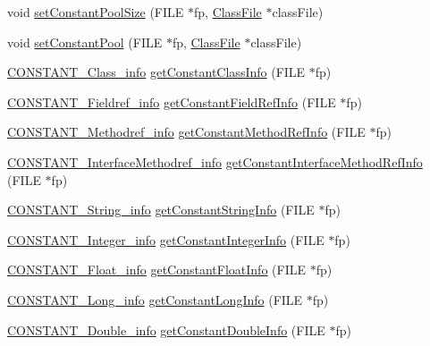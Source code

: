 \begin{DoxyCompactItemize}
void \hyperlink{classLeitorExibidor_a13b5c2cf5de57b6cea330a425f7e55be}{set\+Constant\+Pool\+Size} (F\+I\+LE $\ast$fp, \hyperlink{classClassFile}{Class\+File} $\ast$class\+File)
\item 
void \hyperlink{classLeitorExibidor_a34dc148775506753f609e643ac931cac}{set\+Constant\+Pool} (F\+I\+LE $\ast$fp, \hyperlink{classClassFile}{Class\+File} $\ast$class\+File)
\item 
\hyperlink{structCONSTANT__Class__info}{C\+O\+N\+S\+T\+A\+N\+T\+\_\+\+Class\+\_\+info} \hyperlink{classLeitorExibidor_a105cc85df3dce1817b67d49a6af55075}{get\+Constant\+Class\+Info} (F\+I\+LE $\ast$fp)
\item 
\hyperlink{structCONSTANT__Fieldref__info}{C\+O\+N\+S\+T\+A\+N\+T\+\_\+\+Fieldref\+\_\+info} \hyperlink{classLeitorExibidor_abef996cec1493870298ba1c13aba9a12}{get\+Constant\+Field\+Ref\+Info} (F\+I\+LE $\ast$fp)
\item 
\hyperlink{structCONSTANT__Methodref__info}{C\+O\+N\+S\+T\+A\+N\+T\+\_\+\+Methodref\+\_\+info} \hyperlink{classLeitorExibidor_adfb763ec31e25964a5566c3d453ea297}{get\+Constant\+Method\+Ref\+Info} (F\+I\+LE $\ast$fp)
\item 
\hyperlink{structCONSTANT__InterfaceMethodref__info}{C\+O\+N\+S\+T\+A\+N\+T\+\_\+\+Interface\+Methodref\+\_\+info} \hyperlink{classLeitorExibidor_a01b35468a048d479576f9c99440b9306}{get\+Constant\+Interface\+Method\+Ref\+Info} (F\+I\+LE $\ast$fp)
\item 
\hyperlink{structCONSTANT__String__info}{C\+O\+N\+S\+T\+A\+N\+T\+\_\+\+String\+\_\+info} \hyperlink{classLeitorExibidor_a4b2e1f73e85d73953a97571684ec9ceb}{get\+Constant\+String\+Info} (F\+I\+LE $\ast$fp)
\item 
\hyperlink{structCONSTANT__Integer__info}{C\+O\+N\+S\+T\+A\+N\+T\+\_\+\+Integer\+\_\+info} \hyperlink{classLeitorExibidor_aa9d25cd5fe52c32bb51f9209cf8ef7e6}{get\+Constant\+Integer\+Info} (F\+I\+LE $\ast$fp)
\item 
\hyperlink{structCONSTANT__Float__info}{C\+O\+N\+S\+T\+A\+N\+T\+\_\+\+Float\+\_\+info} \hyperlink{classLeitorExibidor_af858b066d00fec9a5fcc6b4e63046393}{get\+Constant\+Float\+Info} (F\+I\+LE $\ast$fp)
\item 
\hyperlink{structCONSTANT__Long__info}{C\+O\+N\+S\+T\+A\+N\+T\+\_\+\+Long\+\_\+info} \hyperlink{classLeitorExibidor_a336e0f9abfbda32438aa285469993547}{get\+Constant\+Long\+Info} (F\+I\+LE $\ast$fp)
\item 
\hyperlink{structCONSTANT__Double__info}{C\+O\+N\+S\+T\+A\+N\+T\+\_\+\+Double\+\_\+info} \hyperlink{classLeitorExibidor_aa16859827e46b1a61c8d0bfa747754e3}{get\+Constant\+Double\+Info} (F\+I\+LE $\ast$fp)

\end{DoxyCompactItemize}
